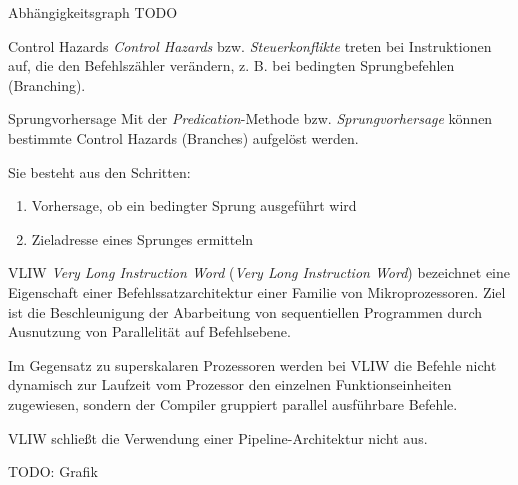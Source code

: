 \begin{defi}{Abhängigkeitsgraph}
    TODO
\end{defi}

\begin{defi}{Control Hazards}
    \emph{Control Hazards} bzw. \emph{Steuerkonflikte} treten bei Instruktionen auf, die den Befehlszähler verändern, z. B. bei bedingten Sprungbefehlen (Branching).
\end{defi}

\begin{defi}{Sprungvorhersage}
    Mit der \emph{Predication}-Methode bzw. \emph{Sprungvorhersage} können bestimmte Control Hazards (Branches) aufgelöst werden.

    Sie besteht aus den Schritten:
    \begin{enumerate}
        \item Vorhersage, ob ein bedingter Sprung ausgeführt wird
        \item Zieladresse eines Sprunges ermitteln
    \end{enumerate}
\end{defi}

\begin{defi}[Befehlssatzarchitektur]{VLIW}
    \emph{Very Long Instruction Word} (\emph{Very Long Instruction Word}) bezeichnet eine Eigenschaft einer Befehlssatzarchitektur einer Familie von Mikroprozessoren.
    Ziel ist die Beschleunigung der Abarbeitung von sequentiellen Programmen durch Ausnutzung von Parallelität auf Befehlsebene.

    Im Gegensatz zu superskalaren Prozessoren werden bei VLIW die Befehle nicht dynamisch zur Laufzeit vom Prozessor den einzelnen Funktionseinheiten zugewiesen, sondern der Compiler gruppiert parallel ausführbare Befehle.

    VLIW schließt die Verwendung einer Pipeline-Architektur nicht aus.

    TODO: Grafik
\end{defi}

